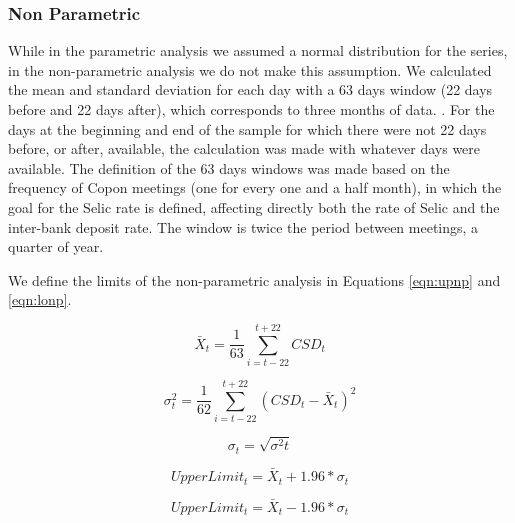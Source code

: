 \documentclass[a4paper]{article}
\begin{document}
\subsubsection{Non Parametric}

While in the parametric analysis we assumed a normal distribution for the series, in the non-parametric analysis we do not make this assumption. We calculated the mean and standard deviation for each day with a 63 days window (22 days before and 22 days after), which corresponds to three months of data. . For the days at the beginning and end of the sample for which there were not 22 days before, or after, available, the calculation was made with whatever days were available. The definition of the 63 days windows was made based on the frequency of Copon meetings (one for every one and a half month), in which the goal for the Selic rate is defined, affecting directly both the rate of Selic and the inter-bank deposit rate. The window is twice the period between meetings, a quarter of year.

We define the limits of the non-parametric analysis in Equations \ref{eqn:upnp} and \ref{eqn:lonp}.

$$\bar{X}_t = \frac{1}{63} \displaystyle\sum_{i=t-22}^{t+22} CSD_t$$

$$\sigma^2_t = \frac{1}{62} \displaystyle\sum_{i=t-22}^{t+22} (CSD_t - \bar{X}_t)^2$$

$$\sigma_t = \sqrt{\sigma^2t}$$

\begin{equation}
\label{eqn:upnp}
UpperLimit_t = \bar{X}_t + 1.96 * \sigma_t
\end{equation}

\begin{equation}
\label{eqn:lonp}
UpperLimit_t = \bar{X}_t - 1.96 * \sigma_t
\end{equation}

\begin{comment}
\begin{equation}
\label{eqn:upnp}
UpperLimitt = \frac{1}{63} \displaystyle\sum_{i=t-22}^{t+22} Volatilityt + 1.96 * \Big(\frac{1}{62} \displaystyle\sum_{i=t-22}^{t+22} (Volatilityt - \frac{1}{63} \displaystyle\sum_{i=t-22}^{t+22} Volatilityt)^2\Big)^{1/2}
\end{equation}

\begin{equation}
\label{eqn:lonp}
LowerLimitt = \frac{1}{63} \displaystyle\sum_{i=t-22}^{t+22} Volatilityt - 1.96 * \Big(\frac{1}{62} \displaystyle\sum_{i=t-22}^{t+22} (Volatilityt - \frac{1}{63} \displaystyle\sum_{i=t-22}^{t+22} Volatilityt)^2\Big)^{1/2}
\end{equation}
\end{comment}
\end{document}
